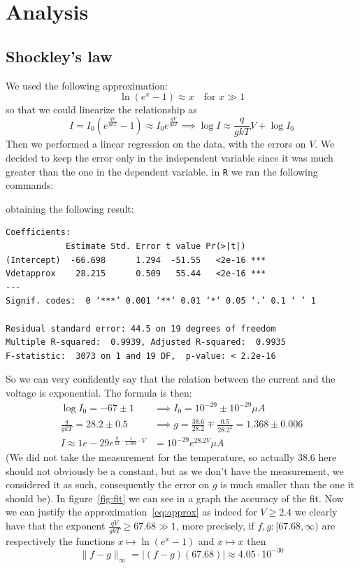\documentclass{report}
\numberwithin{equation}{section}
\theoremstyle{plain}
\theoremstyle{definition}
\theoremstyle{remark}
\begin{document}
   \section{Analysis}\label{sec:analysis}   

   \subsection{Shockley's law}
    We used the following approximation:
    \begin{equation}\label{eq:approx}
        \ln {(e^{x} - 1)} \approx x \quad \text{for } x \gg 1
    \end{equation}
    so that we could linearize the relationship as
    \[
        I = I_0 \left( e^{\frac{qV}{gkT}} - 1 \right) \approx I_0
        e^{\frac{qV}{gkT}} \implies \log I \approx \frac{q}{gkT} V + \log I_{0}
    \]
    Then we performed a linear regression on the data, with the errors on \(V\).
    We decided to keep the error only in the independent variable since it was
    much greater than the one in the dependent variable. 
   in \texttt{R} we ran the following commands:

   obtaining the following result:
   \begin{verbatim}
Coefficients:
            Estimate Std. Error t value Pr(>|t|)    
(Intercept)  -66.698      1.294  -51.55   <2e-16 ***
Vdetapprox    28.215      0.509   55.44   <2e-16 ***
---
Signif. codes:  0 ‘***’ 0.001 ‘**’ 0.01 ‘*’ 0.05 ‘.’ 0.1 ‘ ’ 1

Residual standard error: 44.5 on 19 degrees of freedom
Multiple R-squared:  0.9939, Adjusted R-squared:  0.9935 
F-statistic:  3073 on 1 and 19 DF,  p-value: < 2.2e-16  
   \end{verbatim}
   So we can very confidently say that the relation between the current and the
   voltage is exponential. The formula is then:
   \begin{align*}
       \log I_{0} = -67 \pm 1 &\implies I_{0} = 10^{-29} \pm 
       10^{-29} \mu A\\
       \frac{q}{gkT} = 28.2 \pm 0.5 &\implies g = \frac{38.6}{28.2} \mp
       \frac{0.5}{28.2^2} = 1.368 \pm 0.006\\
       I \approx 1e-29 e^{\frac{q}{kT} \cdot \frac{1}{1.368} \cdot V} &= 10^{-29}
       e^{28.2 V} \mu A
   \end{align*}
   (We did not take the measurement for the temperature, so actually 38.6 here
   should not obviously be a constant, but as we don't have the measurement, we
   considered it as such, consequently the error on \(g\) is much smaller than
   the one it should be).
   In figure~\ref{fig:fit} we can see in a graph the accuracy of the fit. Now we
   can justify the approximation~\eqref{eq:approx} as indeed for \(V \ge 2.4\)
   we clearly have that the exponent \(\frac{qV}{gkT} \ge 67.68 \gg 1\), more
   precisely, if \(f, g: [67.68, \infty)\) are respectively the functions \(x
   \mapsto \ln {(e^{x} - 1)}\) and \(x \mapsto x\) then
   \[
       \|f - g\|_{\infty} = |{(f - g)}{(67.68)}| \approx 4.05 \cdot 10^{-30}
   \]
\end{document}
